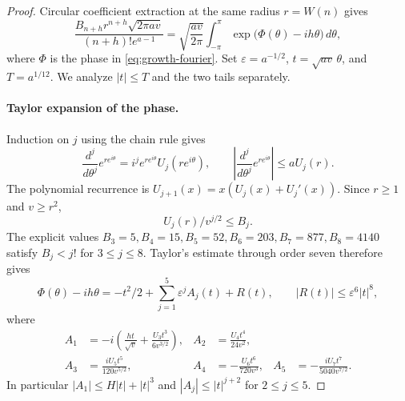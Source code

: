 \begin{proof}
Circular coefficient extraction at the same radius $r=W(n)$ gives
\[
 \frac{B_{n+h}r^{n+h}\sqrt{2\pi av}}{(n+h)!e^{a-1}}
 =\sqrt{\frac{av}{2\pi}}\int_{-\pi}^{\pi}
       \exp\bigl(\Phi(\theta)-ih\theta\bigr)\,d\theta,
\]
where $\Phi$ is the phase in \eqref{eq:growth-fourier}.  Set
$\varepsilon=a^{-1/2}$, $t=\sqrt{av}\,\theta$, and
$T=a^{1/12}$.  We analyze $|t|\le T$ and the two tails separately.

\paragraph{Taylor expansion of the phase.}
Induction on $j$ using the chain rule gives
\[
 \frac{d^j}{d\theta^j}e^{r e^{i\theta}}
   =i^j e^{r e^{i\theta}}U_j(r e^{i\theta}),
 \qquad
 \left|\frac{d^j}{d\theta^j}e^{r e^{i\theta}}\right|
   \le aU_j(r).
\]
The polynomial recurrence is $U_{j+1}(x)=x(U_j(x)+U_j'(x))$.
Since $r\ge1$ and $v\ge r^2$,
\begin{equation}\label{eq:touchard-derivative-bound}
 U_j(r)/v^{j/2}\le B_j.
\end{equation}
The explicit values $B_3=5,B_4=15,B_5=52,B_6=203,B_7=877,B_8=4140$
satisfy $B_j<j!$ for $3\le j\le8$.
Taylor's estimate through order seven therefore gives
\[
 \Phi(\theta)-ih\theta=-t^2/2+
       \sum_{j=1}^5\varepsilon^j A_j(t)+R(t),
 \qquad |R(t)|\le\varepsilon^6|t|^8,
\]
where
\begin{align*}
 A_1&=-i\left(\frac{ht}{\sqrt v}+
                         \frac{U_3t^3}{6v^{3/2}}\right),&
 A_2&=\frac{U_4t^4}{24v^2},\\
 A_3&=\frac{iU_5t^5}{120v^{5/2}},&
 A_4&=-\frac{U_6t^6}{720v^3},&
 A_5&=-\frac{iU_7t^7}{5040v^{7/2}}.
\end{align*}
In particular $|A_1|\le H|t|+|t|^3$ and
$|A_j|\le|t|^{j+2}$ for $2\le j\le5$.


\end{proof}
